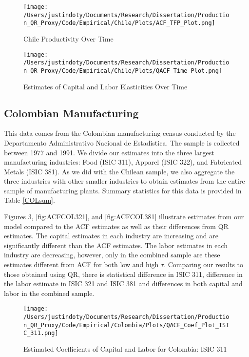 \documentclass[11pt]{article}
\begin{document}
\begin{figure}[H]
\centering
\caption{Chile Productivity Over Time}
\texttt{[image: /Users/justindoty/Documents/Research/Dissertation/Production\_QR\_Proxy/Code/Empirical/Chile/Plots/ACF\_TFP\_Plot.png]}
\label{fig:ACFCHLpgrowth}
\end{figure}

\begin{figure}[H]
\centering
\caption{Estimates of Capital and Labor Elasticities Over Time}
\texttt{[image: /Users/justindoty/Documents/Research/Dissertation/Production\_QR\_Proxy/Code/Empirical/Chile/Plots/QACF\_Time\_Plot.png]}
\label{fig:ACFCHLtimecoef}
\end{figure}



\subsection{Colombian Manufacturing}
This data comes from the Colombian manufacturing census conducted by the Departamento Administrativo Nacional de Estadistica. The sample is collected between 1977 and 1991. We divide our estimates into the three largest manufacturing industries: Food (ISIC 311), Apparel (ISIC 322), and Fabricated Metals (ISIC 381). As we did with the Chilean sample, we also aggregate the three industries with other smaller industries to obtain estimates from the entire sample of manufacturing plants. Summary statistics for this data is provided in Table \ref{COLsum}.

Figures \ref{fig:ACFCOL311}, \ref{fig:ACFCOL321}, and \ref{fig:ACFCOL381} illustrate estimates from our model compared to the ACF estimates as well as their differences from QR estimates. The capital estimates in each industry are increasing and are significantly different than the ACF estimates. The labor estimates in each industry are decreasing, however, only in the combined sample are these estimates different from ACF for both low and high $\tau$. Comparing our results to those obtained using QR, there is statistical difference in ISIC 311, difference in the labor estimate in ISIC 321 and ISIC 381 and differences in both capital and labor in the combined sample.

\begin{figure}[H]
\centering
\caption{Estimated Coefficients of Capital and Labor for Colombia: ISIC 311}
\texttt{[image: /Users/justindoty/Documents/Research/Dissertation/Production\_QR\_Proxy/Code/Empirical/Colombia/Plots/QACF\_Coef\_Plot\_ISIC\_311.png]}
\label{fig:ACFCOL311}
\end{figure}
\end{document}
